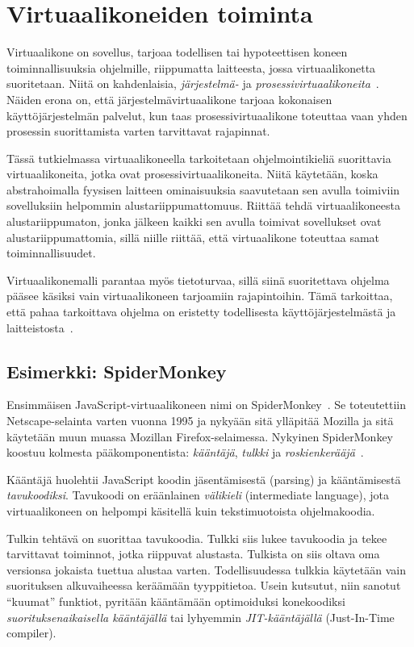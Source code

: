\section{Virtuaalikoneiden toiminta}

Virtuaalikone on sovellus, tarjoaa todellisen tai hypoteettisen koneen toiminnallisuuksia ohjelmille, riippumatta laitteesta, jossa virtuaalikonetta suoritetaan. Niitä on kahdenlaisia, \textit{järjestelmä-} ja \textit{prosessivirtuaalikoneita}~\cite[s.~33]{vms}. Näiden erona on, että järjestelmävirtuaalikone tarjoaa kokonaisen käyttöjärjestelmän palvelut, kun taas prosessivirtuaalikone toteuttaa vaan yhden prosessin suorittamista varten tarvittavat rajapinnat.

Tässä tutkielmassa virtuaalikoneella tarkoitetaan ohjelmointikieliä suorittavia virtuaalikoneita, jotka ovat prosessivirtuaalikoneita. Niitä käytetään, koska abstrahoimalla fyysisen laitteen ominaisuuksia saavutetaan sen avulla toimiviin sovelluksiin helpommin alustariippumattomuus. Riittää tehdä virtuaalikoneesta alustariippumaton, jonka jälkeen kaikki sen avulla toimivat sovellukset ovat alustariippumattomia, sillä niille riittää, että virtuaalikone toteuttaa samat toiminnallisuudet.

Virtuaalikonemalli parantaa myös tietoturvaa, sillä siinä suoritettava ohjelma pääsee käsiksi vain virtuaalikoneen tarjoamiin rajapintoihin. Tämä tarkoittaa, että pahaa tarkoittava ohjelma on eristetty todellisesta käyttöjärjestelmästä ja laitteistosta~\cite[s.~36]{vms}.

\subsection{Esimerkki: SpiderMonkey}

Ensimmäisen JavaScript-virtuaalikoneen nimi on SpiderMonkey~\cite{spidermonkey}. Se toteutettiin Netscape-selainta varten vuonna 1995 ja nykyään sitä ylläpitää Mozilla ja sitä käytetään muun muassa Mozillan Firefox-selaimessa. Nykyinen SpiderMonkey koostuu kolmesta pääkomponentista: \textit{kääntäjä}, \textit{tulkki} ja \textit{roskienkerääjä}~\cite{spidermonkeydesign}.

Kääntäjä huolehtii JavaScript koodin jäsentämisestä (parsing) ja kääntämisestä \textit{tavukoodiksi}. Tavukoodi on eräänlainen \textit{välikieli} (intermediate language), jota virtuaalikoneen on helpompi käsitellä kuin tekstimuotoista ohjelmakoodia.

Tulkin tehtävä on suorittaa tavukoodia. Tulkki siis lukee tavukoodia ja tekee tarvittavat toiminnot, jotka riippuvat alustasta. Tulkista on siis oltava oma versionsa jokaista tuettua alustaa varten. Todellisuudessa tulkkia käytetään vain suorituksen alkuvaiheessa keräämään tyyppitietoa. Usein kutsutut, niin sanotut ``kuumat'' funktiot, pyritään kääntämään optimoiduksi konekoodiksi \textit{suorituksenaikaisella kääntäjällä} tai lyhyemmin \textit{JIT-kääntäjällä} (Just-In-Time compiler).

